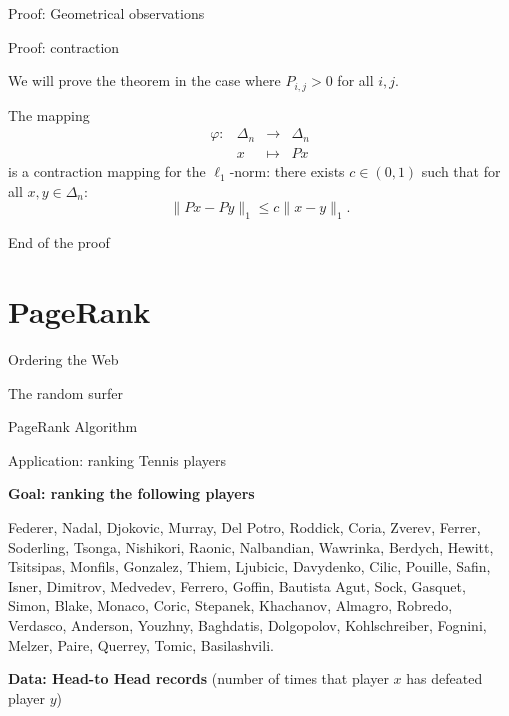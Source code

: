 \documentclass{beamer}
\begin{document}
\begin{frame}[t]{Proof: Geometrical observations}
	\grid

\end{frame}

\begin{frame}[t]{Proof: contraction}
	\grid

	\vspace{-0.3cm}
	We will prove the theorem in the case where $P_{i,j} > 0$ for all $i,j$.
	\vspace{-0.3cm}
	\begin{lemma}\label{lem:contract}
		The mapping 
		$$
		\begin{array}{cccc}
			\varphi:& \Delta_n &\to& \Delta_n \\
					& x & \mapsto & Px
		\end{array}
		$$
		is a contraction mapping for the $\ell_1$-norm: there exists $c \in (0,1)$ such that for all $x,y \in \Delta_n$:
		$$
		\| Px - Py \|_1 \leq c \| x-y\|_1.
		$$
	\end{lemma}

\end{frame}
\begin{frame}[t]{End of the proof}
	\grid
	\pause
	\pause
\end{frame}

\section{PageRank}
\begin{frame}[t]{Ordering the Web}
	\grid
\end{frame}

\begin{frame}[t]{The random surfer}
	\grid
	\pause
\end{frame}

\begin{frame}[t]{PageRank Algorithm}
	\grid
\end{frame}

\begin{frame}[t]{Application: ranking Tennis players}
	\grid

	\textbf{Goal: ranking the following players}
	\begin{center}
		Federer, Nadal, Djokovic, Murray, Del Potro, Roddick, Coria, Zverev, Ferrer, Soderling, Tsonga, Nishikori, Raonic, Nalbandian, Wawrinka, Berdych, Hewitt, Tsitsipas, Monfils, Gonzalez, Thiem, Ljubicic, Davydenko, Cilic, Pouille, Safin, Isner, Dimitrov, Medvedev, Ferrero, Goffin, Bautista Agut, Sock, Gasquet, Simon, Blake, Monaco, Coric, Stepanek, Khachanov, Almagro, Robredo, Verdasco, Anderson, Youzhny, Baghdatis, Dolgopolov, Kohlschreiber, Fognini, Melzer, Paire, Querrey, Tomic, Basilashvili.
	\end{center}

	\textbf{Data: Head-to Head records} (number of times that player $x$ has defeated player $y$)

\end{frame}
\end{document}
